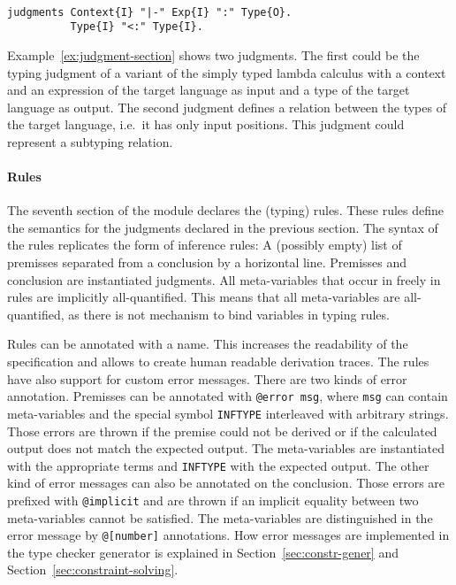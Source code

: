 \begin{example}{~}
\begin{verbatim}
judgments Context{I} "|-" Exp{I} ":" Type{O}.
          Type{I} "<:" Type{I}.
\end{verbatim}
\label{ex:judgment-section}
\end{example}

Example~\ref{ex:judgment-section} shows two judgments. The first could
be the typing judgment of a variant of the simply typed lambda
calculus with a context and an expression of the target language as
input and a type of the target language as output. The second judgment
defines a relation between the types of the target language, i.e.\ it
has only input positions. This judgment could represent a subtyping
relation.

\paragraph{Rules} The seventh section of the module declares the
(typing) rules. These rules define the semantics for the judgments
declared in the previous section. The syntax of the rules replicates
the form of inference rules: A (possibly empty) list of premisses
separated from a conclusion by a horizontal line. Premisses and
conclusion are instantiated judgments. All meta-variables that occur
in freely in rules are implicitly all-quantified. This means that all
meta-variables are all-quantified, as there is not mechanism to bind
variables in typing rules.

Rules can be annotated with a name. This increases the readability of
the specification and allows to create human readable derivation
traces. The rules have also support for custom error messages. There
are two kinds of error annotation. Premisses can be annotated with
\verb|@error msg|, where \verb|msg| can contain meta-variables and the
special symbol \verb|INFTYPE| interleaved with arbitrary
strings. Those errors are thrown if the premise could not be derived
or if the calculated output does not match the expected output. The
meta-variables are instantiated with the appropriate terms and
\verb|INFTYPE| with the expected output. The other kind of error
messages can also be annotated on the conclusion. Those errors are
prefixed with \verb|@implicit| and are thrown if an implicit equality
between two meta-variables cannot be satisfied. The meta-variables are
distinguished in the error message by \verb|@[number]|
annotations. How error messages are implemented in the type checker
generator is explained in Section~\ref{sec:constr-gener} and
Section~\ref{sec:constraint-solving}.

